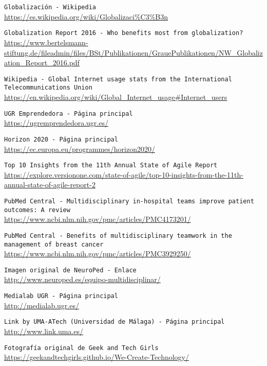 
 {\tt Globalización - Wikipedia}\\
\url{https://es.wikipedia.org/wiki/Globalizaci%C3%B3n}

 {\tt Globalization Report 2016 - Who benefits most from globalization?}\\
\url{https://www.bertelsmann-stiftung.de/fileadmin/files/BSt/Publikationen/GrauePublikationen/NW_Globalization_Report_2016.pdf}

 {\tt Wikipedia - Global Internet usage stats from the International Telecommunications Union}\\
\url{https://en.wikipedia.org/wiki/Global_Internet_usage#Internet_users}

 {\tt UGR Emprendedora - Página principal}\\
\url{https://ugremprendedora.ugr.es/}

 {\tt Horizon 2020 - Página principal}\\
\url{https://ec.europa.eu/programmes/horizon2020/}

 {\tt Top 10 Insights from the 11th Annual State of Agile Report}\\
\url{https://explore.versionone.com/state-of-agile/top-10-insights-from-the-11th-annual-state-of-agile-report-2}

 {\tt PubMed Central - Multidisciplinary in-hospital teams improve patient outcomes: A review}\\
\url{https://www.ncbi.nlm.nih.gov/pmc/articles/PMC4173201/}

 {\tt PubMed Central - Benefits of multidisciplinary teamwork in the management of breast cancer}\\
\url{https://www.ncbi.nlm.nih.gov/pmc/articles/PMC3929250/}

 {\tt Imagen original de NeuroPed - Enlace}\\
\url{http://www.neuroped.es/equipo-multidisciplinar/}

 {\tt Medialab UGR - Página principal}\\
\url{http://medialab.ugr.es/}

 {\tt Link by UMA-ATech (Universidad de Málaga) - Página principal}\\
\url{http://www.link.uma.es/}

 {\tt Fotografía original de Geek and Tech Girls}\\
\url{https://geekandtechgirls.github.io/We-Create-Technology/}


